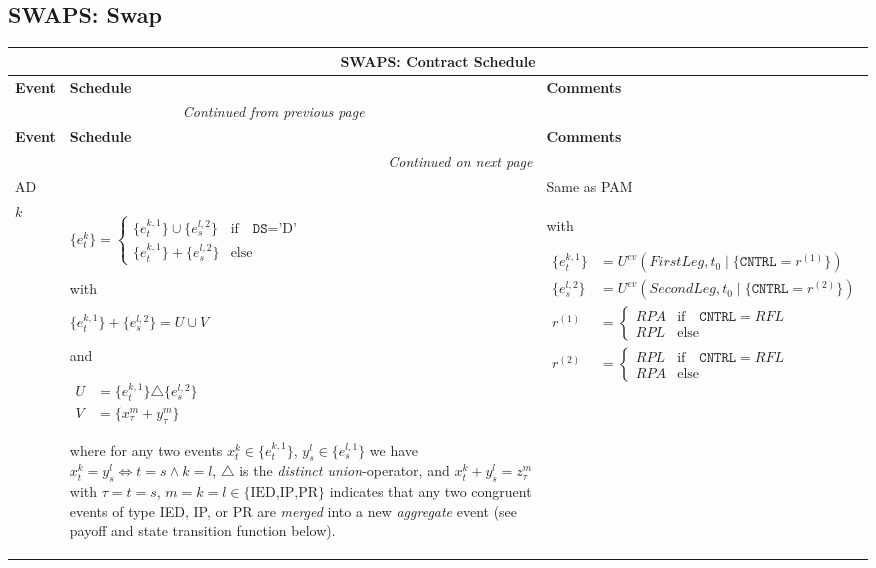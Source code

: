 \documentclass[9pt,oneside]{amsart}
\newenvironment{schedule}[1]{
	\begin{longtable}[H]{| p{0.05\textwidth} | p{0.5\textwidth} |  p{0.4\textwidth} |}
	\multicolumn{3}{c}{\textbf{#1: Contract Schedule}}\\
	\hline
	\textbf{Event} & \textbf{Schedule} & \textbf{Comments} \\
	\hline
	\endfirsthead
	\multicolumn{2}{c}{\textit{Continued from previous page}} \\
	\hline
	\textbf{Event} & \textbf{Schedule} & \textbf{Comments} \\
	\hline
	\endhead
	\hline \multicolumn{2}{r}{\textit{Continued on next page}} \\
	\endfoot
	\hline
	\endlastfoot
}{%
	\hline
	\end{longtable}
}
\newcommand{\attr}[1]{\texttt{#1}}
\newcommand{\cldev}[3]{U^{ev}(#1,#2 \mid\{#3\})}
\begin{document}
\subsection{SWAPS: Swap}\label{sec:swaps}




\begin{schedule}{SWAPS}
	AD & & Same as PAM \\
	\hline
	$k$ & $\{e_t^k\} = \begin{cases}
				\{e_t^{k,1}\}\cup \{e_s^{l,2}\} & \text{if}\quad \attr{DS}=\text{'D'} \\
				\{e_t^{k,1}\} + \{e_s^{l,2}\} & \text{else} \end{cases}$ \par
	with\par
	$\{e_t^{k,1}\}+\{e_s^{l,2}\} = U \cup V$\par
	and\par
	{$\begin{aligned}
		U &= \{e_t^{k,1}\} \triangle \{e_s^{l,2}\}\\
		V &= \{x_\tau^m+y_\tau^m\}
	\end{aligned}$} \par
	where for any two events $x_t^k\in\{e_t^{k,1}\}$, $y_s^l\in\{e_s^{l,1}\}$ we have $x_t^k=y_s^l \iff t=s \land k=l$, $\triangle$ is the \textit{distinct union}-operator, and $x_t^k+y_s^l=z_\tau^m$ with $\tau=t=s$, $m=k=l\in\{\text{IED,IP,PR}\}$ indicates that any two congruent events of type IED, IP, or PR are \textit{merged} into a new \textit{aggregate} event (see payoff and state transition function below).
		& with\par
			{$\begin{aligned}
				\{e_t^{k,1}\} &= \cldev{FirstLeg}{t_0}{\attr{CNTRL}=r^{(1)}} \\
				\{e_s^{l,2}\} &= \cldev{SecondLeg}{t_0}{\attr{CNTRL}=r^{(2)}} \\
				r^{(1)} &= \begin{cases} RPA & \text{if}\quad \attr{CNTRL}=RFL \\
					RPL & \text{else} \end{cases} \\
				r^{(2)} &= \begin{cases} RPL & \text{if}\quad \attr{CNTRL}=RFL \\
					RPA & \text{else} \end{cases}
			\end{aligned}$} \\
\end{schedule}
\end{document}
